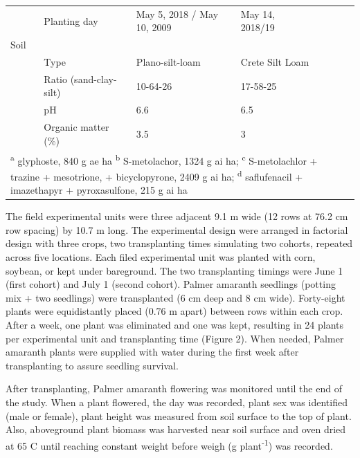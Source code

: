 \documentclass[utf8]{frontiersSCNS}
\begin{document}
\begin{table}[!h]
{\begin{tabular}[t]{lllllll}
\multirow{-6}{*}{\raggedright\arraybackslash } & Planting day & May 5, 2018 / May 10, 2009 & May 14, 2018/19 &  &  & \\

Soil &  &  &  &  &  & \\

 & Type & Plano-silt-loam & Crete Silt Loam &  &  & \\

 & Ratio (sand-clay-silt) & 10-64-26 & 17-58-25 &  &  & \\

 & pH & 6.6 & 6.5 &  &  & \\

\multirow{-4}{*}{\raggedright\arraybackslash } & Organic matter (\%) & 3.5 & 3 &  &  & \\
\bottomrule
\multicolumn{7}{l}{\rule{0pt}{1em}\textsuperscript{a} glyphoste, 840 g ae ha \textsuperscript{b} S-metolachor, 1324 g ai ha; \textsuperscript{c} S-metolachlor + trazine + mesotrione, + bicyclopyrone, 2409 g ai ha; \textsuperscript{d} saflufenacil + imazethapyr + pyroxasulfone, 215 g ai ha}\\
\end{tabular}}
\end{table}

The field experimental units were three adjacent 9.1 m wide (12 rows at
76.2 cm row spacing) by 10.7 m long. The experimental design were
arranged in factorial design with three crops, two transplanting times
simulating two cohorts, repeated across five locations. Each filed
experimental unit was planted with corn, soybean, or kept under
bareground. The two transplanting timings were June 1 (first cohort) and
July 1 (second cohort). Palmer amaranth seedlings (potting mix + two
seedlings) were transplanted (6 cm deep and 8 cm wide). Forty-eight
plants were equidistantly placed (0.76 m apart) between rows within each
crop. After a week, one plant was eliminated and one was kept, resulting
in 24 plants per experimental unit and transplanting time (Figure 2).
When needed, Palmer amaranth plants were supplied with water during the
first week after transplanting to assure seedling survival.

After transplanting, Palmer amaranth flowering was monitored until the
end of the study. When a plant flowered, the day was recorded, plant sex
was identified (male or female), plant height was measured from soil
surface to the top of plant. Also, aboveground plant biomass was
harvested near soil surface and oven dried at 65 C until reaching
constant weight before weigh (g plant\textsuperscript{-1}) was recorded.
\end{document}

